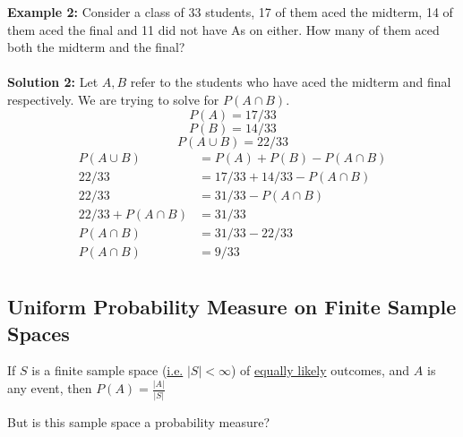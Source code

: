 \documentclass[12pt]{article}
\begin{document}
\textbf{Example 2:} Consider a class of 33 students, 17 of them aced the midterm, 14 of them aced the final and 11 did not have As on either. How many of them aced both the midterm and the final?\\
\\
\textbf{Solution 2:} Let $A,B$ refer to the students who have aced the midterm and final respectively. We are trying to solve for $P(A \cap B)$.\\
$$P(A) = 17/33$$
$$P(B) = 14/33$$
$$P(A \cup B) = 22/33$$
\begin{align*}
	P(A \cup B) &= P(A) + P(B) - P(A \cap B)\\
	22/33 &= 17/33 + 14/33 - P(A \cap B)\\
	22/33 &= 31/33 - P(A \cap B)\\
	22/33 + P(A \cap B) &= 31/33\\
	P(A \cap B) &= 31/33 - 22/33\\
	P(A \cap B) &= 9/33\\
\end{align*}

\subsection{Uniform Probability Measure on Finite Sample Spaces}

\begin{tcolorbox}[title=Uniform Probability Measure on Finite Sample Spaces (UPMFSS)]
	If $S$ is a finite sample space (\underline{i.e.} $|S| < \infty$) of \underline{equally likely} outcomes, and $A$ is any event, then $P(A) = \frac{|A|}{|S|}$
\end{tcolorbox}

But is this sample space a probability measure?
\end{document}
